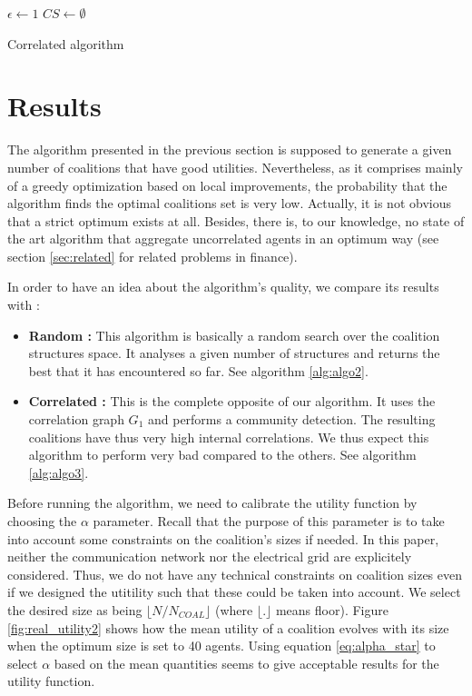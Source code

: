 \documentclass[conference]{IEEEtran}
\begin{document}
\begin{algorithm}
 $ \epsilon \leftarrow 1 $ \;
 $ CS \leftarrow \emptyset $\;
 \caption{Correlated algorithm}
\label{alg:algo3}
\end{algorithm}

\section{Results}

The algorithm presented in the previous section is supposed to generate a given number of coalitions that have good utilities. Nevertheless, as it comprises mainly of a greedy optimization based on local improvements, the probability that the algorithm finds the optimal coalitions set is very low. Actually, it is not obvious that a strict optimum exists at all. Besides, there is, to our knowledge, no state of the art algorithm that aggregate uncorrelated agents in an optimum way (see section \ref{sec:related} for related problems in finance).


In order to have an idea about the algorithm's quality, we compare its results with :
\begin{itemize}
\item \textbf{Random :} This algorithm is basically a random search over the coalition structures space. It analyses a given number of structures and returns the best that it has encountered so far. See algorithm \ref{alg:algo2}.
\item \textbf{Correlated :} This is the complete opposite of our algorithm. It uses the correlation graph $ G_{1} $ and performs a community detection. The resulting coalitions have thus very high internal correlations. We thus expect this algorithm to perform very bad compared to the others. See algorithm \ref{alg:algo3}.
\end{itemize} 


Before running the algorithm, we need to calibrate the utility function by choosing the $ \alpha $ parameter. Recall that the purpose of this parameter is to take into account some constraints on the coalition's sizes if needed. In this paper, neither the communication network nor the electrical grid are explicitely considered. Thus, we do not have any technical constraints on coalition sizes even if we designed the utitility such that these could be taken into account. We select the desired size as being $ \lfloor N/N_{COAL} \rfloor $ (where $ \lfloor.\rfloor $ means floor). Figure \ref{fig:real_utility2} shows how the mean utility of a coalition evolves with its size when the optimum size is set to 40 agents. Using equation \ref{eq:alpha_star} to select $ \alpha $ based on the mean quantities seems to give acceptable results for the utility function.
\end{document}
